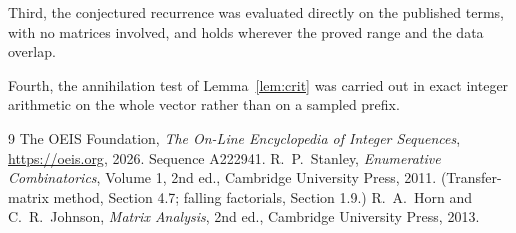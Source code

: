 \documentclass[11pt,a4paper]{article}
\theoremstyle{plain}
\theoremstyle{definition}
\begin{document}
Third, the conjectured recurrence was evaluated directly on the published terms, with no
matrices involved, and holds wherever the proved range and the data overlap.

Fourth, the annihilation test of Lemma~\ref{lem:crit} was carried out in exact integer
arithmetic on the whole vector rather than on a sampled prefix.

\begin{thebibliography}{9}
 The OEIS Foundation, \emph{The On-Line Encyclopedia of Integer
Sequences}, \url{https://oeis.org}, 2026. Sequence A222941.
 R.~P.~Stanley, \emph{Enumerative Combinatorics}, Volume 1, 2nd ed.,
Cambridge University Press, 2011. (Transfer-matrix method, Section 4.7; falling factorials,
Section 1.9.)
 R.~A.~Horn and C.~R.~Johnson, \emph{Matrix Analysis}, 2nd ed., Cambridge
University Press, 2013.
\end{thebibliography}
\end{document}
